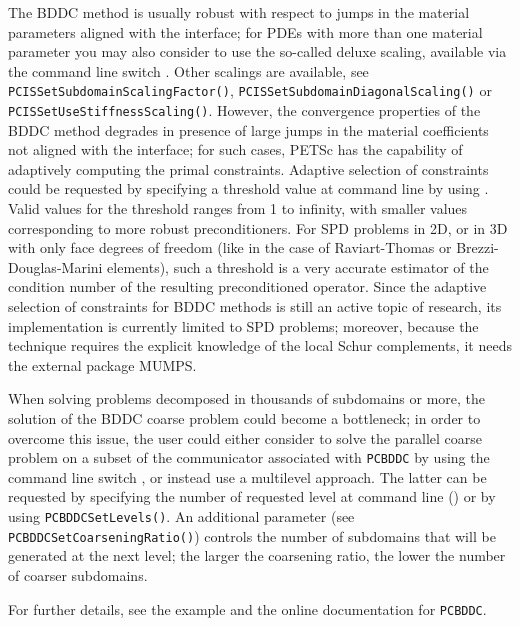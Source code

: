 The BDDC method is usually robust with respect to jumps in the material parameters aligned with the interface;
for PDEs with more than one material parameter you may also consider to use the so-called deluxe scaling,
available via the command line switch . Other scalings are available,
see \lstinline{PCISSetSubdomainScalingFactor()}, \break\lstinline{PCISSetSubdomainDiagonalScaling()} or \lstinline{PCISSetUseStiffnessScaling()}.
However, the convergence properties of the BDDC method degrades in presence of large jumps in the material coefficients
not aligned with the interface; for such cases, PETSc has the capability of adaptively computing the primal constraints.
Adaptive selection of constraints could be requested by specifying a threshold value at command line by using
. Valid values for the threshold  ranges from 1 to infinity,
with smaller values corresponding to more robust preconditioners. For SPD problems in 2D, or in 3D with only face degrees of freedom
(like in the case of Raviart-Thomas or Brezzi-Douglas-Marini elements), such a threshold is a very accurate estimator
of the condition number of the resulting preconditioned operator. Since the adaptive selection of constraints for BDDC methods is still
an active topic of research, its implementation is currently limited to SPD problems; moreover, because the technique requires the
explicit knowledge of the local Schur complements, it needs the external package MUMPS.

When solving problems decomposed in thousands of subdomains or more, the solution of the BDDC coarse problem could become a bottleneck;
in order to overcome this issue, the user could either consider to solve the parallel coarse problem on a subset of the communicator
associated with \lstinline{PCBDDC} by using the command line switch , or instead use a multilevel approach.
The latter can be requested by specifying the number of requested level at command line () or by using \lstinline{PCBDDCSetLevels()}.
An additional parameter (see \lstinline{PCBDDCSetCoarseningRatio()}) controls the number of subdomains that will be generated at the next level;
the larger the coarsening ratio, the lower the number of coarser subdomains.

For further details, see the example \href{https://www.mcs.anl.gov/petsc/petsc-current/src/ksp/ksp/tutorials/ex59.c}{} and the online documentation for \lstinline{PCBDDC}.

